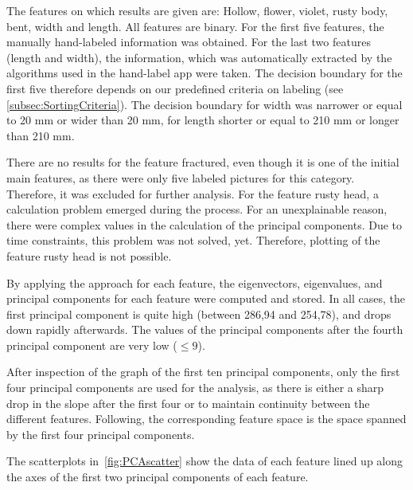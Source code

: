 \bigskip
The features on which results are given are: Hollow, flower, violet, rusty body, bent, width and length. All features are binary. For the first five features, the manually hand-labeled information was obtained. For the last two features (length and width), the information, which was automatically extracted by the algorithms used in the hand-label app were taken. The decision boundary for the first five therefore depends on our predefined criteria on labeling (see \autoref{subsec:SortingCriteria}). The decision boundary for width was narrower or equal to 20 mm or wider than 20 mm, for length shorter or equal to 210 mm or longer than 210 mm.

There are no results for the feature fractured, even though it is one of the initial main features, as there were only five labeled pictures for this category. Therefore, it was excluded for further analysis. For the feature rusty head, a calculation problem emerged during the process. For an unexplainable reason, there were complex values in the calculation of the principal components. Due to time constraints, this problem was not solved, yet. Therefore, plotting of the feature rusty head is not possible.

By applying the approach for each feature, the eigenvectors, eigenvalues, and principal components for each feature were computed and stored. In all cases, the first principal component is quite high (between 286,94 and 254,78), and drops down rapidly afterwards. The values of the principal components after the fourth principal component are very low ($\leqslant 9$).

\bigskip
After inspection of the graph of the first ten principal components,  only the first four principal components are used for the analysis, as there is either a sharp drop in the slope after the first four or to maintain continuity between the different features. Following, the corresponding feature space is the space spanned by the first four principal components.

The scatterplots in~\autoref{fig:PCAscatter} show the data of each feature lined up along the axes of the first two principal components of each feature.

